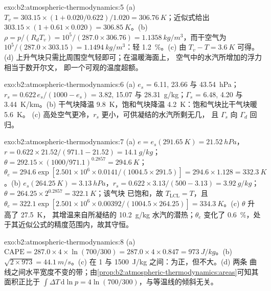 \begin{solution}{exo:b2:atmospheric-thermodynamics:5}
(a) $T_v = 303.15 \times (1 + 0.020/0.622)/1.020 = \qty{306.76}{K}$；近似式给出
$303.15 \times (1 + 0.61 \times 0.020) = \qty{306.85}{K}$。(b) $\rho = p/(R_dT_v) = 10^5/(287.0
\times 306.76) = \qty{1.1358}{kg/m^3}$，而干空气为 $10^5/(287.0 \times 303.15) =
\qty{1.1494}{kg/m^3}$：轻 \qty{1.2}{\percent}。(c) 由 $T_v - T =
\qty{3.6}{K}$ 可得。(d) 上升气块只需比周围空气轻即可；在温暖海面上，
空气中的水汽所增加的浮力相当于数开尔文，
即一个可观的温度超额。
\end{solution}

\begin{solution}{exo:b2:atmospheric-thermodynamics:6}
(a) $e_s$ = 6.11, 23.66 与 \qty{43.54}{hPa}；$r_s = 0.622\,e_s/(1000 - e_s)$ = 3.82, 15.07 与
\qty{28.31}{g/kg}；$\Gamma_s$ = 6.48, 4.20 与 \qty{3.44}{K/km}。(b) 干气块降温
\qty{9.8}{K}，饱和气块降温 \qty{4.2}{K}：饱和气块比干气块暖 \qty{5.6}{K}。
(c) 高处空气更冷，$r_s$ 更小，可供凝结的水汽所剩无几，
且 $\Gamma_s$ 向 $\Gamma_d$ 回归。
\end{solution}

\begin{solution}{exo:b2:atmospheric-thermodynamics:7}
(a) $e = e_s(\qty{291.65}{K}) = \qty{21.52}{hPa}$，$r = 0.622 \times 21.52/(971.1 - 21.52) =
\qty{14.1}{g/kg}$；$\theta = 292.15 \times (1000/971.1)^{0.2857} = \qty{294.6}{K}$；$\theta_e =
294.6 \exp[2.501 \times 10^6 \times 0.0141/(1004.5 \times 291.5)] = 294.6 \times 1.128 =
\qty{332.3}{K}$。(b) $e_s(\qty{264.25}{K}) = \qty{3.13}{hPa}$，$r_s = 0.622 \times 3.13/(500 -
3.13) = \qty{3.92}{g/kg}$；$\theta = 264.25 \times 2^{0.2857} = \qty{322.1}{K}$；该气块
已饱和，故 $T_{\text{LCL}} = T$，且 $\theta_e = 322.1 \exp[2.501 \times 10^6 \times
0.00392/(1004.5 \times 264.25)] = \qty{334.3}{K}$。(c) $\theta$ 升高了 \qty{27.5}{K}，
其增温来自所凝结的 \qty{10.2}{g/kg} 水汽的潜热；$\theta_e$ 变化了
\qty{0.6}{\percent}，处于其近似公式的精度范围内，故其守恒。
\end{solution}

\begin{solution}{exo:b2:atmospheric-thermodynamics:8}
(a) $\text{CAPE} = 287.0 \times 4 \times \ln(700/300) = 287.0 \times 4 \times 0.847 =
\qty{973}{J/kg}$。(b) $\sqrt{2 \times 973} = \qty{44.1}{m/s}$。(c) 在 1 与
\qty{1500}{J/kg} 之间：为正，但不大。(d) 两条
曲线之间水平宽度不变的带；由\cref{prop:b2:atmospheric-thermodynamics:areas}可知其面积正比于 $\int
\Delta T\,\mathrm{d}\ln p = 4 \ln(700/300)$，与等温线的倾斜无关。
\end{solution}

